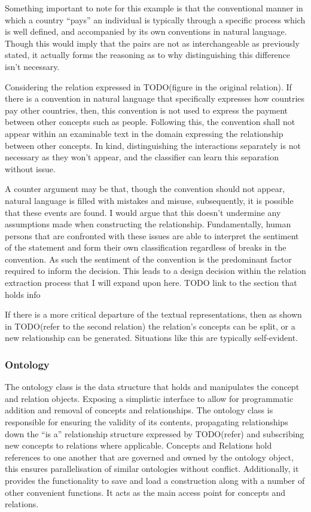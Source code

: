 \documentclass[11pt]{article} %
\begin{document}
Something important to note for this example is that the conventional manner in which a country “pays” an individual is typically through a specific process which is well defined, and accompanied by its own conventions in natural language. Though this would imply that the pairs are not as interchangeable as previously stated, it actually forms the reasoning as to why distinguishing this difference isn’t necessary.

Considering the relation expressed in TODO(figure in the original relation). If there is a convention in natural language that specifically expresses how countries pay other countries, then, this convention is not used to express the payment between other concepts such as people. Following this, the convention shall not appear within an examinable text in the domain expressing the relationship between other concepts. In kind, distinguishing the interactions separately is not necessary as they won’t appear, and the classifier can learn this separation without issue.

A counter argument may be that, though the convention should not appear, natural language is filled with mistakes and misuse, subsequently, it is possible that these events are found. I would argue that this doesn’t undermine any assumptions made when constructing the relationship. Fundamentally, human persons that are confronted with these issues are able to interpret the sentiment of the statement and form their own classification regardless of breaks in the convention. As such the sentiment of the convention is the predominant factor required to inform the decision. This leads to a design decision within the relation extraction process that I will expand upon here. TODO link to the section that holds info

If there is a more critical departure of the textual representations, then as shown in TODO(refer to the second relation) the relation's concepts can be split, or a new relationship can be generated. Situations like this are typically self-evident.

\subsubsection{Ontology}

The ontology class is the data structure that holds and manipulates the concept and relation objects. Exposing a simplistic interface to allow for programmatic addition and removal of concepts and relationships. The ontology class is responsible for ensuring the validity of its contents, propagating relationships down the “is a” relationship structure expressed by TODO(refer) and subscribing new concepts to relations where applicable. Concepts and Relations hold references to one another that are governed and owned by the ontology object, this ensures parallelisation of similar ontologies without conflict. Additionally, it provides the functionality to save and load a construction along with a number of other convenient functions. It acts as the main access point for concepts and relations.
\end{document}

